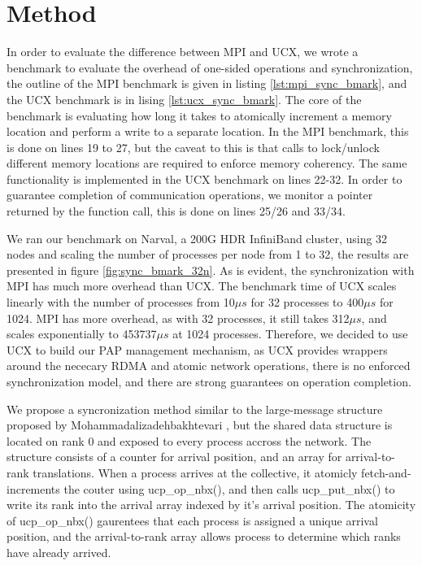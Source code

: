 \section{Method}

In order to evaluate the difference between MPI and UCX, we wrote a benchmark to evaluate the overhead of one-sided operations and synchronization, the outline of the MPI benchmark is given in listing \ref{lst:mpi_sync_bmark}, and the UCX benchmark is in lising \ref{lst:ucx_sync_bmark}.
The core of the benchmark is evaluating how long it takes to atomically increment a memory location and perform a write to a separate location.
In the MPI benchmark, this is done on lines 19 to 27, but the caveat to this is that calls to lock/unlock different memory locations are required to enforce memory coherency.
The same functionality is implemented in the UCX benchmark on lines 22-32.
In order to guarantee completion of communication operations, we monitor a pointer returned by the function call, this is done on lines 25/26 and 33/34.

We ran our benchmark on Narval, a 200G HDR InfiniBand cluster, using 32 nodes and scaling the number of processes per node from 1 to 32, the results are presented in figure \ref{fig:sync_bmark_32n}.
As is evident, the synchronization with MPI has much more overhead than UCX.
The benchmark time of UCX scales linearly with the number of processes from 10$\mu s$ for 32 processes to 400$\mu s$ for 1024.
MPI has more overhead, as with 32 processes, it still takes 312$\mu s$, and scales exponentially to 453737$\mu s$ at 1024 processes.
Therefore, we decided to use UCX to build our PAP management mechanism, as UCX provides wrappers around the nececary RDMA and atomic network operations, there is no enforced synchronization model, and there are strong guarantees on operation completion. 

\lstset{style = bklstc}
\lstset{label = lst:mpi_sync_bmark}
\lstset{caption = Benchmark to evaluate the overhead of MPI for one-sided operations}


\lstset{label = lst:ucx_sync_bmark}
\lstset{caption = Benchmark to evaluate the overhead of UCX for one-sided operations}




We propose a syncronization method similar to the large-message structure proposed by Mohammadalizadehbakhtevari \cite{Mohammadalizadehbakhtevari2021Thesis}, but the shared data structure is located on rank 0 and exposed to every process accross the network.
The structure consists of a counter for arrival position, and an array for arrival-to-rank translations.
When a process arrives at the collective, it atomicly fetch-and-increments the couter using ucp\_op\_nbx(), and then calls ucp\_put\_nbx() to write its rank into the arrival array indexed by it's arrival position.
The atomicity of ucp\_op\_nbx() gaurentees that each process is assigned a unique arrival position, and the arrival-to-rank array allows process to determine which ranks have already arrived.

